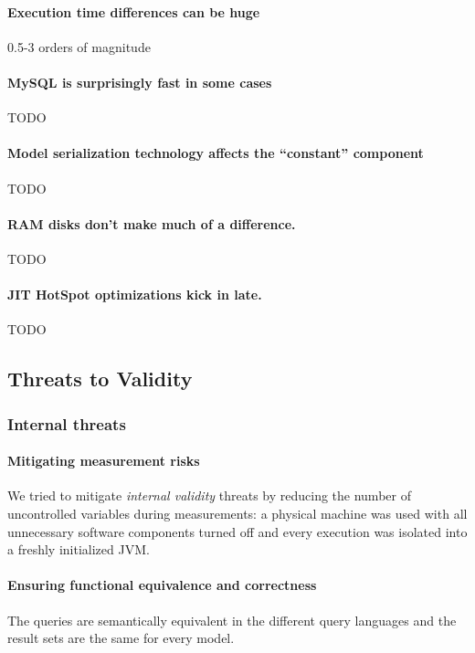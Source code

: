 \paragraph{Execution time differences can be huge}
0.5-3 orders of magnitude

\paragraph{MySQL is surprisingly fast in some cases}
TODO

\paragraph{Model serialization technology affects the ``constant'' component}
TODO

\paragraph{RAM disks don't make much of a difference.}
TODO

\paragraph{JIT HotSpot optimizations kick in late.}
TODO

\subsection{Threats to Validity}

\subsubsection{Internal threats}

\paragraph{Mitigating measurement risks}
We tried to mitigate \emph{internal validity} threats by reducing the number of
uncontrolled variables during measurements: a physical machine was used with all
unnecessary software components turned off and every execution was isolated into
a freshly initialized JVM.

\paragraph{Ensuring functional equivalence and correctness}
The queries are semantically equivalent in the different query languages and the
result sets are the same for every model. 


